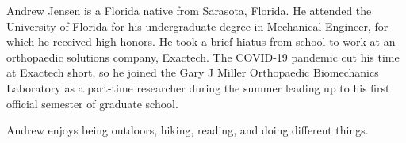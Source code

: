 Andrew Jensen is a Florida native from Sarasota, Florida. He attended the University of Florida for his undergraduate degree in Mechanical Engineer, for which he received high honors. He took a brief hiatus from school to work at an orthopaedic solutions company, Exactech. The COVID-19 pandemic cut his time at Exactech short, so he joined the Gary J Miller Orthopaedic Biomechanics Laboratory as a part-time researcher during the summer leading up to his first official semester of graduate school.

Andrew enjoys being outdoors, hiking, reading, and doing different things.
